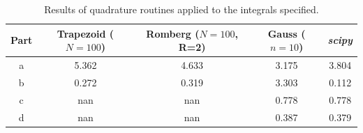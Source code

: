 {\begin{table}[h!tb]
    \centering
    \begin{tabular}{|c||c|c|c|c|}
        \hline
        Part & Trapezoid ($N = 100$) & Romberg ($N = 100$, R=2) & Gauss ($n = 10$) & \textit{scipy} \\
        \hline
        a & 5.362 & 4.633 & 3.175 & 3.804 \\
        b & 0.272 & 0.319 & 3.303 & 0.112 \\
        c & nan & nan & 0.778 & 0.778 \\
        d & nan & nan & 0.387 & 0.379 \\
        \hline
    \end{tabular}
    \caption{Results of quadrature routines applied to the integrals specified.}
    \label{tab:prob2}
\end{table}



}



